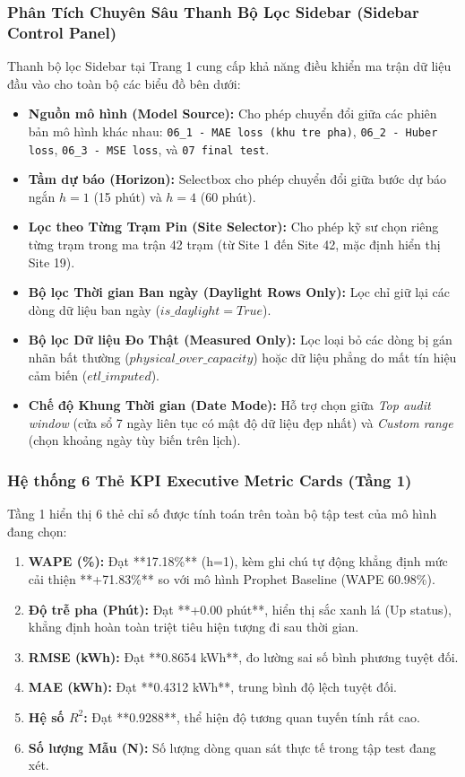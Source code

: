\documentclass[12pt,a4paper]{article}
\begin{document}
\subsubsection{Phân Tích Chuyên Sâu Thanh Bộ Lọc Sidebar (Sidebar Control Panel)}
Thanh bộ lọc Sidebar tại Trang 1 cung cấp khả năng điều khiển ma trận dữ liệu đầu vào cho toàn bộ các biểu đồ bên dưới:
\begin{itemize}
    \item \textbf{Nguồn mô hình (Model Source):} Cho phép chuyển đổi giữa các phiên bản mô hình khác nhau: \texttt{06\_1 - MAE loss (khu tre pha)}, \texttt{06\_2 - Huber loss}, \texttt{06\_3 - MSE loss}, và \texttt{07 final test}.
    \item \textbf{Tầm dự báo (Horizon):} Selectbox cho phép chuyển đổi giữa bước dự báo ngắn $h=1$ (15 phút) và $h=4$ (60 phút).
    \item \textbf{Lọc theo Từng Trạm Pin (Site Selector):} Cho phép kỹ sư chọn riêng từng trạm trong ma trận 42 trạm (từ Site 1 đến Site 42, mặc định hiển thị Site 19).
    \item \textbf{Bộ lọc Thời gian Ban ngày (Daylight Rows Only):} Lọc chỉ giữ lại các dòng dữ liệu ban ngày ($is\_daylight = True$).
    \item \textbf{Bộ lọc Dữ liệu Đo Thật (Measured Only):} Lọc loại bỏ các dòng bị gán nhãn bất thường ($physical\_over\_capacity$) hoặc dữ liệu phẳng do mất tín hiệu cảm biến ($etl\_imputed$).
    \item \textbf{Chế độ Khung Thời gian (Date Mode):} Hỗ trợ chọn giữa \textit{Top audit window} (cửa sổ 7 ngày liên tục có mật độ dữ liệu đẹp nhất) và \textit{Custom range} (chọn khoảng ngày tùy biến trên lịch).
\end{itemize}

\subsubsection{Hệ thống 6 Thẻ KPI Executive Metric Cards (Tầng 1)}
Tầng 1 hiển thị 6 thẻ chỉ số được tính toán trên toàn bộ tập test của mô hình đang chọn:
\begin{enumerate}
    \item \textbf{WAPE (\%):} Đạt **17.18\%** (h=1), kèm ghi chú tự động khẳng định mức cải thiện **+71.83\%** so với mô hình Prophet Baseline (WAPE 60.98\%).
    \item \textbf{Độ trễ pha (Phút):} Đạt **+0.00 phút**, hiển thị sắc xanh lá (Up status), khẳng định hoàn toàn triệt tiêu hiện tượng đi sau thời gian.
    \item \textbf{RMSE (kWh):} Đạt **0.8654 kWh**, đo lường sai số bình phương tuyệt đối.
    \item \textbf{MAE (kWh):} Đạt **0.4312 kWh**, trung bình độ lệch tuyệt đối.
    \item \textbf{Hệ số $R^2$:} Đạt **0.9288**, thể hiện độ tương quan tuyến tính rất cao.
    \item \textbf{Số lượng Mẫu (N):} Số lượng dòng quan sát thực tế trong tập test đang xét.
\end{enumerate}
\end{document}
